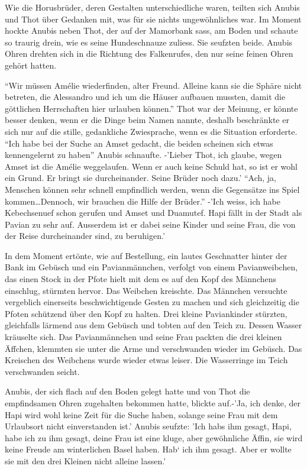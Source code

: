 \documentclass[11pt,titlepage,a5paper]{book}
\begin{document}
Wie die Horusbrüder, deren Gestalten unterschiedliche waren, teilten sich Anubis und Thot über Gedanken mit, was für sie nichts ungewöhnliches war. Im Moment hockte Anubis neben Thot, der auf der Mamorbank sass, am Boden und schaute so traurig drein, wie es seine Hundeschnauze zuliess. Sie seufzten beide. Anubis Ohren drehten sich in die Richtung des Falkenrufes, den nur seine feinen Ohren gehört hatten. 

"`Wir müssen Amélie wiederfinden, alter Freund. Alleine kann sie die Sphäre nicht betreten, die Alessandro und ich um die Häuser aufbauen mussten, damit die göttlichen Herrschaften hier urlauben können."' Thot war der Meinung, er könnte besser denken, wenn er die Dinge beim Namen nannte, deshalb beschränkte er sich nur auf die stille, gedankliche Zwiesprache, wenn es die Situation erforderte. "`Ich habe bei der Suche an Amset gedacht, die beiden scheinen sich etwas kennengelernt zu haben"' Anubis schnaufte. -'Lieber Thot, ich glaube, wegen Amset ist die Amélie weggelaufen. Wenn er auch keine Schuld hat, so ist er wohl ein Grund. Er bringt sie durcheinander. Seine Brüder noch dazu.' "`Ach, ja, Menschen können sehr schnell empfindlich werden, wenn die Gegensätze ins Spiel kommen\dots Dennoch, wir brauchen die Hilfe der Brüder."' -'Ich weiss, ich habe Kebechsenuef schon gerufen und Amset und Duamutef. Hapi fällt in der Stadt als Pavian zu sehr auf. Ausserdem ist er dabei seine Kinder und seine Frau, die von der Reise durcheinander sind, zu beruhigen.' 

In dem Moment ertönte, wie auf Bestellung, ein lautes Geschnatter hinter der Bank im Gebüsch und ein Pavianmännchen, verfolgt von einem Pavianweibchen, das einen Stock in der Pfote hielt mit dem es auf den Kopf des Männchens einschlug, stürmten hervor. Das Weibchen kreischte. Das Männchen versuchte vergeblich einerseits beschwichtigende Gesten zu machen und sich gleichzeitig die Pfoten schützend über den Kopf zu halten. Drei kleine Paviankinder stürzten, gleichfalls lärmend aus dem Gebüsch und tobten auf den Teich zu. Dessen Wasser kräuselte sich. Das Pavianmännchen und seine Frau packten die drei kleinen Äffchen, klemmten sie unter die Arme und verschwanden wieder im Gebüsch. Das Kreischen des Weibchens wurde wieder etwas leiser. Die Wasserringe im Teich verschwanden seicht.

Anubis, der sich flach auf den Boden gelegt hatte und von Thot die empfindsamen Ohren zugehalten bekommen hatte, blickte auf.-'Ja, ich denke, der Hapi wird wohl keine Zeit für die Suche haben, solange seine Frau mit dem Urlaubsort nicht einverstanden ist.' Anubis seufzte: 'Ich habs ihm gesagt, Hapi, habe ich zu ihm gesagt, deine Frau ist eine kluge, aber gewöhnliche Äffin, sie wird keine Freude am winterlichen Basel haben. Hab` ich ihm gesagt. Aber er wollte sie mit den drei Kleinen nicht alleine lassen.'
\end{document}
